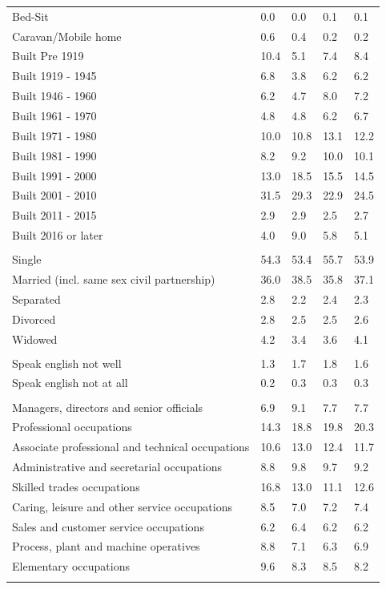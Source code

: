 \documentclass{article}
\begin{document}
\begin{table}[h]
\begin{tabular}{KTTTT}
Bed-Sit & 0.0& 0.0& 0.1& 0.1\\
Caravan/Mobile home & 0.6& 0.4& 0.2& 0.2\\
    \hline
Built Pre 1919 & 10.4&  5.1&  7.4&  8.4\\
Built 1919 - 1945 & 6.8& 3.8& 6.2& 6.2\\
Built  1946 - 1960 & 6.2& 4.7& 8.0& 7.2\\
Built  1961 - 1970 & 4.8& 4.8& 6.2& 6.7\\
Built  1971 - 1980 & 10.0& 10.8& 13.1& 12.2\\
Built  1981 - 1990 &  8.2&  9.2& 10.0& 10.1\\
Built  1991 - 2000 & 13.0& 18.5& 15.5& 14.5\\
Built  2001 - 2010 & 31.5& 29.3& 22.9& 24.5\\
Built  2011 - 2015 & 2.9& 2.9& 2.5& 2.7\\
Built  2016 or later & 4.0& 9.0& 5.8& 5.1\\
\hline
    \\
    \hline
Single & 54.3& 53.4& 55.7& 53.9\\
Married (incl. same sex civil partnership) & 36.0& 38.5& 35.8& 37.1\\
Separated  & 2.8& 2.2& 2.4& 2.3\\
Divorced  & 2.8& 2.5& 2.5& 2.6\\
Widowed & 4.2& 3.4& 3.6& 4.1\\
\hline
    \\ 
    \hline
Speak english not well & 1.3& 1.7& 1.8& 1.6\\
Speak english not at all & 0.2& 0.3& 0.3& 0.3\\
\hline
    \\
    \hline
Managers, directors and senior officials & 6.9& 9.1& 7.7& 7.7\\
Professional occupations & 14.3& 18.8& 19.8& 20.3\\
Associate professional and technical occupations & 10.6& 13.0& 12.4& 11.7\\
Administrative and secretarial occupations & 8.8& 9.8& 9.7& 9.2\\
Skilled trades occupations & 16.8& 13.0& 11.1& 12.6\\
Caring, leisure and other service occupations & 8.5& 7.0& 7.2& 7.4\\
Sales and customer service occupations & 6.2& 6.4& 6.2& 6.2\\
Process, plant and machine operatives & 8.8& 7.1& 6.3& 6.9\\
Elementary occupations & 9.6& 8.3& 8.5& 8.2\\
\hline
\end{tabular}
\end{table}
\end{document}
